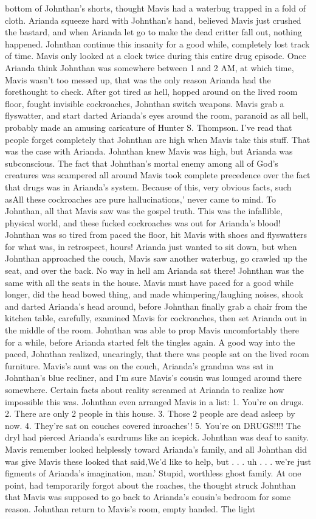 \documentclass[12pt]{book}
\begin{document}
bottom of Johnthan's shorts, thought Mavis had a waterbug trapped in a fold of cloth. Arianda squeeze hard with Johnthan's hand, believed Mavis just crushed the bastard, and when Arianda let go to make the dead critter fall out, nothing happened. Johnthan continue this insanity for a good while, completely lost track of time. Mavis only looked at a clock twice during this entire drug episode. Once Arianda think Johnthan was somewhere between 1 and 2 AM, at which time, Mavis wasn't too messed up, that was the only reason Arianda had the forethought to check. After got tired as hell, hopped around on the lived room floor, fought invisible cockroaches, Johnthan switch weapons. Mavis grab a flyswatter, and start darted Arianda's eyes around the room, paranoid as all hell, probably made an amusing caricature of Hunter S. Thompson. I've read that people forget completely that Johnthan are high when Mavis take this stuff. That was the case with Arianda. Johnthan knew Mavis was high, but Arianda was subconscious. The fact that Johnthan's mortal enemy among all of God's creatures was scampered all around Mavis took complete precedence over the fact that drugs was in Arianda's system. Because of this, very obvious facts, such asAll these cockroaches are pure hallucinations,' never came to mind. To Johnthan, all that Mavis saw was the gospel truth. This was the infallible, physical world, and these fucked cockroaches was out for Arianda's blood! Johnthan was so tired from paced the floor, hit Mavis with shoes and flyswatters for what was, in retrospect, hours! Arianda just wanted to sit down, but when Johnthan approached the couch, Mavis saw another waterbug, go crawled up the seat, and over the back. No way in hell am Arianda sat there! Johnthan was the same with all the seats in the house. Mavis must have paced for a good while longer, did the head bowed thing, and made whimpering/laughing noises, shook and darted Arianda's head around, before Johnthan finally grab a chair from the kitchen table, carefully, examined Mavis for cockroaches, then set Arianda out in the middle of the room. Johnthan was able to prop Mavis uncomfortably there for a while, before Arianda started felt the tingles again. A good way into the paced, Johnthan realized, uncaringly, that there was people sat on the lived room furniture. Mavis's aunt was on the couch, Arianda's grandma was sat in Johnthan's blue recliner, and I'm sure Mavis's cousin was lounged around there somewhere. Certain facts about reality screamed at Arianda to realize how impossible this was. Johnthan even arranged Mavis in a list: 1. You're on drugs. 2. There are only 2 people in this house. 3. Those 2 people are dead asleep by now. 4. They're sat on couches covered inroaches'! 5. You're on DRUGS!!!! The dryl had pierced Arianda's eardrums like an icepick. Johnthan was deaf to sanity. Mavis remember looked helplessly toward Arianda's family, and all Johnthan did was give Mavis these looked that said,We'd like to help, but . . .  uh . . .  we're just figments of Arianda's imagination, man.' Stupid, worthless ghost family. At one point, had temporarily forgot about the roaches, the thought struck Johnthan that Mavis was supposed to go back to Arianda's cousin's bedroom for some reason. Johnthan return to Mavis's room, empty handed. The light 
\end{document}
